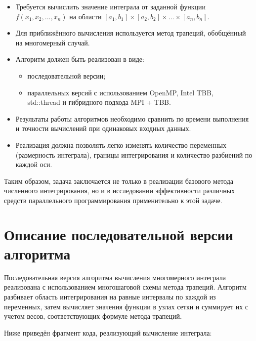 \documentclass[a4paper,14pt]{article}
\begin{document}
\begin{itemize}
    \item Требуется вычислить значение интеграла от заданной функции\\ $f(x_1, x_2, ..., x_n)$ на области $[a_1, b_1] \times [a_2, b_2] \times \dots \times [a_n, b_n]$.
    \item Для приближённого вычисления используется метод трапеций, обобщённый на многомерный случай.
    \item Алгоритм должен быть реализован в виде:
    \begin{itemize}
        \item последовательной версии;
        \item параллельных версий с использованием OpenMP, Intel TBB,\\ std::thread и гибридного подхода MPI + TBB.
    \end{itemize}
    \item Результаты работы алгоритмов необходимо сравнить по времени выполнения и точности вычислений при одинаковых входных данных.
    \item Реализация должна позволять легко изменять количество переменных (размерность интеграла), границы интегрирования и количество разбиений по каждой оси.
\end{itemize}

Таким образом, задача заключается не только в реализации базового метода численного интегрирования, но и в исследовании эффективности различных средств параллельного программирования применительно к этой задаче.

\newpage
\section{Описание последовательной версии алгоритма}

Последовательная версия алгоритма вычисления многомерного интеграла реализована с использованием многошаговой схемы метода трапеций. Алгоритм разбивает область интегрирования на равные интервалы по каждой из переменных, затем вычисляет значения функции в узлах сетки и суммирует их с учетом весов, соответствующих формуле метода трапеций.

Ниже приведён фрагмент кода, реализующий вычисление интеграла:
\end{document}
